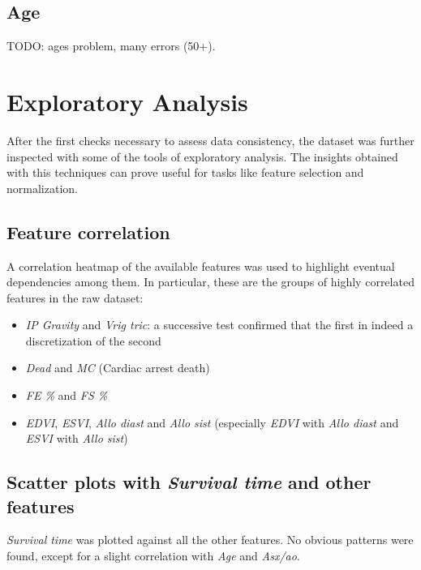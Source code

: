 \documentclass[12pt]{report}
\begin{document}
\subsection*{Age}
TODO: ages problem, many errors (50+).

\section{Exploratory Analysis}
After the first checks necessary to assess data consistency, the dataset was further inspected with some of the tools of exploratory analysis. The insights obtained with this techniques can prove useful for tasks like feature selection and normalization.
\subsection*{Feature correlation}
A correlation heatmap of the available features was used to highlight eventual dependencies among them. In particular, these are the groups of highly correlated features in the raw dataset:
\begin{itemize}
\item \textit{IP Gravity} and \textit{Vrig tric}: a successive test confirmed that the first in indeed a discretization of the second
\item \textit{Dead} and \textit{MC} (Cardiac arrest death)
\item \textit{FE \%} and \textit{FS \%}
\item \textit{EDVI}, \textit{ESVI}, \textit{Allo diast} and \textit{Allo sist} (especially \textit{EDVI} with \textit{Allo diast} and \textit{ESVI} with \textit{Allo sist})
\end{itemize}
\subsection*{Scatter plots with \textit{Survival time} and other features}
\textit{Survival time} was plotted against all the other features. No obvious patterns were found, except for a slight correlation with \textit{Age} and \textit{Asx/ao}.
\end{document}
